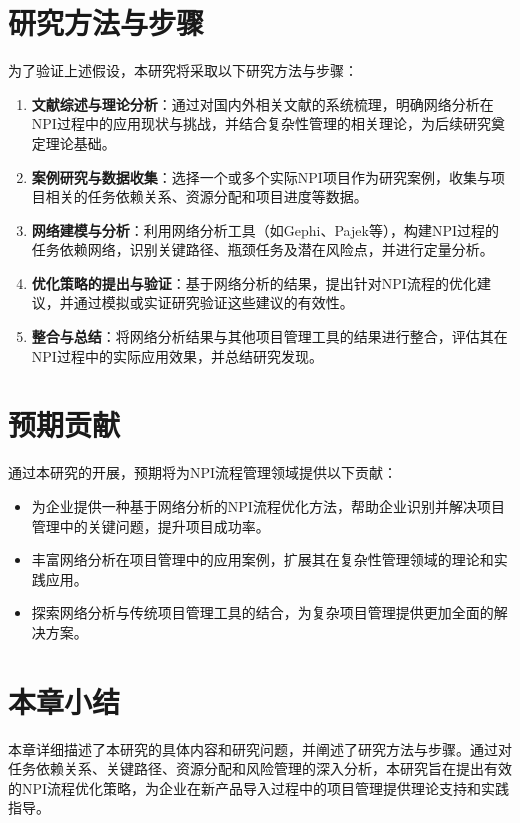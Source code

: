 \section{研究方法与步骤}
为了验证上述假设，本研究将采取以下研究方法与步骤：
\begin{enumerate}
    \item \textbf{文献综述与理论分析}：通过对国内外相关文献的系统梳理，明确网络分析在NPI过程中的应用现状与挑战，并结合复杂性管理的相关理论，为后续研究奠定理论基础。
    \item \textbf{案例研究与数据收集}：选择一个或多个实际NPI项目作为研究案例，收集与项目相关的任务依赖关系、资源分配和项目进度等数据。
    \item \textbf{网络建模与分析}：利用网络分析工具（如Gephi、Pajek等），构建NPI过程的任务依赖网络，识别关键路径、瓶颈任务及潜在风险点，并进行定量分析。
    \item \textbf{优化策略的提出与验证}：基于网络分析的结果，提出针对NPI流程的优化建议，并通过模拟或实证研究验证这些建议的有效性。
    \item \textbf{整合与总结}：将网络分析结果与其他项目管理工具的结果进行整合，评估其在NPI过程中的实际应用效果，并总结研究发现。
\end{enumerate}

\section{预期贡献}
通过本研究的开展，预期将为NPI流程管理领域提供以下贡献：
\begin{itemize}
    \item 为企业提供一种基于网络分析的NPI流程优化方法，帮助企业识别并解决项目管理中的关键问题，提升项目成功率。
    \item 丰富网络分析在项目管理中的应用案例，扩展其在复杂性管理领域的理论和实践应用。
    \item 探索网络分析与传统项目管理工具的结合，为复杂项目管理提供更加全面的解决方案。
\end{itemize}

\section{本章小结}
本章详细描述了本研究的具体内容和研究问题，并阐述了研究方法与步骤。通过对任务依赖关系、关键路径、资源分配和风险管理的深入分析，本研究旨在提出有效的NPI流程优化策略，为企业在新产品导入过程中的项目管理提供理论支持和实践指导。

